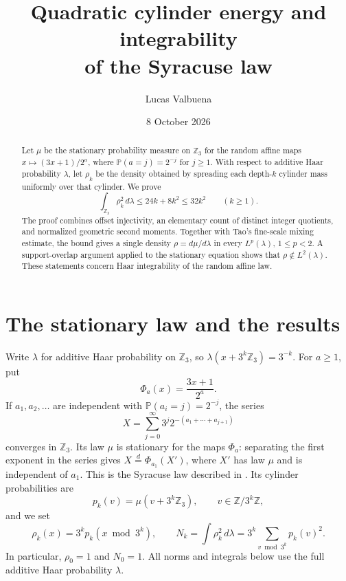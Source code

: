 \documentclass[11pt]{article}
\title{Quadratic cylinder energy and integrability\\of the Syracuse law}
\author{Lucas Valbuena}
\date{8 October 2026}
\theoremstyle{remark}
\newcommand{\Zthree}{\mathbb Z_3}
\newcommand{\Prob}{\mathbb P}
\begin{document}
\maketitle

\begin{abstract}
Let \(\mu\) be the stationary probability measure on \(\Zthree\) for
the random affine maps \(x\mapsto(3x+1)/2^a\), where
\(\Prob(a=j)=2^{-j}\) for \(j\geq1\).  With respect to additive Haar
probability \(\lambda\), let \(\rho_k\) be the density obtained by
spreading each depth-\(k\) cylinder mass uniformly over that cylinder.
We prove
\[
  \int_{\Zthree}\rho_k^2\,d\lambda
  \leq24k+8k^2\leq32k^2\qquad(k\geq1).
\]
The proof combines offset injectivity, an elementary count of distinct
integer quotients, and normalized geometric second moments.  Together
with Tao's fine-scale mixing estimate, the bound gives a single density
\(\rho=d\mu/d\lambda\) in every \(L^p(\lambda)\), \(1\leq p<2\).
A support-overlap argument applied to the stationary equation shows
that \(\rho\notin L^2(\lambda)\).  These statements concern Haar
integrability of the random affine law.
\end{abstract}

\section{The stationary law and the results}

Write \(\lambda\) for additive Haar probability on \(\Zthree\), so
\(\lambda(x+3^k\Zthree)=3^{-k}\).  For \(a\geq1\), put
\[
  \Phi_a(x)=\frac{3x+1}{2^a}.
\]
If \(a_1,a_2,\ldots\) are independent with
\(\Prob(a_i=j)=2^{-j}\), the series
\begin{equation}\label{eq:random-series}
  X=\sum_{j=0}^{\infty}3^j2^{-(a_1+\cdots+a_{j+1})}
\end{equation}
converges in \(\Zthree\).  Its law \(\mu\) is stationary for the
maps \(\Phi_a\): separating the first exponent in the series gives
\(X\overset{d}{=}\Phi_{a_1}(X')\), where \(X'\) has law \(\mu\)
and is independent of \(a_1\).  This is the Syracuse law described in
\cite[Remark~1.13]{Tao}.  Its cylinder probabilities are
\[
  p_k(v)=\mu(v+3^k\Zthree),\qquad v\in\mathbb Z/3^k\mathbb Z,
\]
and we set
\begin{equation}\label{eq:rho-energy}
  \rho_k(x)=3^k p_k(x\bmod3^k),\qquad
  N_k=\int\rho_k^2\,d\lambda
      =3^k\sum_{v\bmod3^k}p_k(v)^2.
\end{equation}
In particular, \(\rho_0=1\) and \(N_0=1\).  All norms and integrals
below use the full additive Haar probability \(\lambda\).
\end{document}
